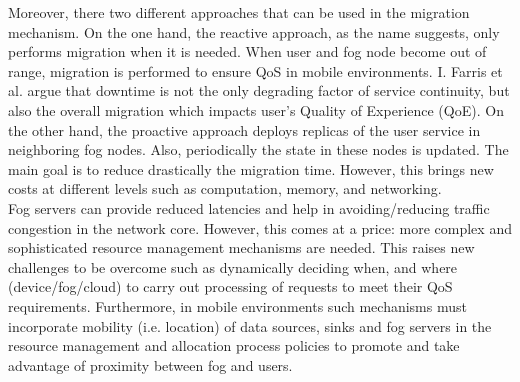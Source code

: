 \noindent\tab Moreover, there two different approaches that can be used in the migration mechanism. On the one hand, the reactive approach, as the name suggests, only performs migration when it is needed. When user and fog node become out of range, migration is performed to ensure QoS in mobile environments. I. Farris et al. \cite{farris2017optimizing} argue that downtime is not the only degrading factor of service continuity, but also the overall migration which impacts user's Quality of Experience (QoE). On the other hand, the proactive approach deploys replicas of the user service in neighboring fog nodes. Also, periodically the state in these nodes is updated. The main goal is to reduce drastically the migration time. However, this brings new costs at different levels such as computation, memory, and networking.\\
\noindent\tab Fog servers can provide reduced latencies and help in avoiding/reducing traffic congestion in the network core. However, this comes at a price: more complex and sophisticated resource management mechanisms are needed. This raises new challenges to be overcome such as dynamically deciding when, and where (device/fog/cloud) to carry out processing of requests to meet their QoS requirements. Furthermore, in mobile environments such mechanisms must incorporate mobility (i.e. location) of data sources, sinks and fog servers in the resource management and allocation process policies to promote and take advantage of proximity between fog and users.